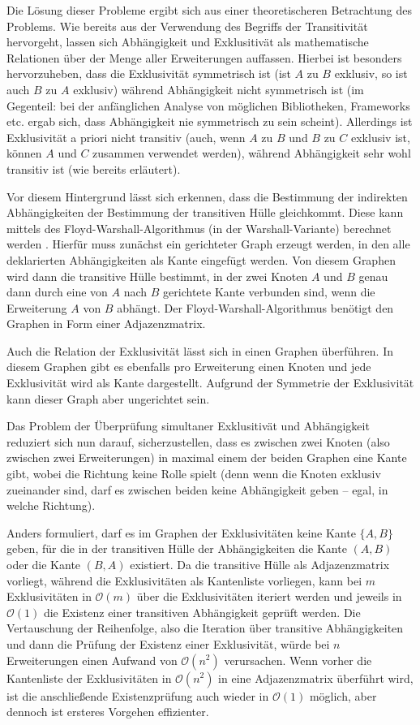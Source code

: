 Die Lösung dieser Probleme ergibt sich aus einer theoretischeren Betrachtung des Problems. Wie bereits aus der Verwendung des Begriffs der Transitivität hervorgeht, lassen sich Abhängigkeit und Exklusitivät als mathematische Relationen über der Menge aller Erweiterungen auffassen. Hierbei ist besonders hervorzuheben, dass die Exklusivität symmetrisch ist (ist $A$ zu $B$ exklusiv, so ist auch $B$ zu $A$ exklusiv) während Abhängigkeit nicht symmetrisch ist (im Gegenteil: bei der anfänglichen Analyse von möglichen Bibliotheken, Frameworks etc. ergab sich, dass Abhängigkeit nie symmetrisch zu sein scheint). Allerdings ist Exklusivität a priori nicht transitiv (auch, wenn $A$ zu $B$ und $B$ zu $C$ exklusiv ist, können $A$ und $C$ zusammen verwendet werden), während Abhängigkeit sehr wohl transitiv ist (wie bereits erläutert).

Vor diesem Hintergrund lässt sich erkennen, dass die Bestimmung der indirekten Abhängigkeiten der Bestimmung der transitiven Hülle gleichkommt. Diese kann mittels des Floyd-Warshall-Algorithmus (in der Warshall-Variante) berechnet werden \cite{warshal1_algorithm}. Hierfür muss zunächst ein gerichteter Graph erzeugt werden, in den alle deklarierten Abhängigkeiten als Kante eingefügt werden. Von diesem Graphen wird dann die transitive Hülle bestimmt, in der zwei Knoten $A$ und $B$ genau dann durch eine von $A$ nach $B$ gerichtete Kante verbunden sind, wenn die Erweiterung $A$ von $B$ abhängt. Der Floyd-Warshall-Algorithmus benötigt den Graphen in Form einer Adjazenzmatrix.

Auch die Relation der Exklusivität lässt sich in einen Graphen überführen. In diesem Graphen gibt es ebenfalls pro Erweiterung einen Knoten und jede Exklusivität wird als Kante dargestellt. Aufgrund der Symmetrie der Exklusivität kann dieser Graph aber ungerichtet sein.

Das Problem der Überprüfung simultaner Exklusitivät und Abhängigkeit reduziert sich nun darauf, sicherzustellen, dass es zwischen zwei Knoten (also zwischen zwei Erweiterungen) in maximal einem der beiden Graphen eine Kante gibt, wobei die Richtung keine Rolle spielt (denn wenn die Knoten exklusiv zueinander sind, darf es zwischen beiden keine Abhängigkeit geben -- egal, in welche Richtung).

Anders formuliert, darf es im Graphen der Exklusivitäten keine Kante $\{A, B\}$ geben, für die in der transitiven Hülle der Abhängigkeiten die Kante $(A, B)$ oder die Kante $(B, A)$ existiert. Da die transitive Hülle als Adjazenzmatrix vorliegt, während die Exklusivitäten als Kantenliste vorliegen, kann bei $m$ Exklusivitäten in $\mathcal{O}(m)$ über die Exklusivitäten iteriert werden und jeweils in $\mathcal{O}(1)$ die Existenz einer transitiven Abhängigkeit geprüft werden. Die Vertauschung der Reihenfolge, also die Iteration über transitive Abhängigkeiten und dann die Prüfung der Existenz einer Exklusivität, würde bei $n$ Erweiterungen einen Aufwand von $\mathcal{O}(n^2)$ verursachen. Wenn vorher die Kantenliste der Exklusivitäten in $\mathcal{O}(n^2)$ in eine Adjazenzmatrix überführt wird, ist die anschließende Existenzprüfung auch wieder in $\mathcal{O}(1)$ möglich, aber dennoch ist ersteres Vorgehen effizienter.


